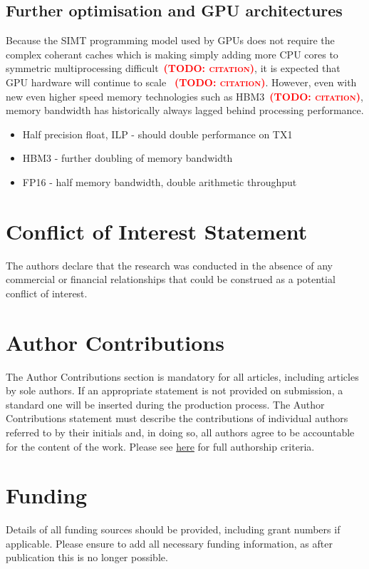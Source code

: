 \documentclass[utf8]{frontiersSCNS} %
\newcommand{\todo}[1]{\textbf{\textsc{\textcolor{red}{(TODO: #1)}}}}
\begin{document}
\subsection{Further optimisation and GPU architectures}

Because the SIMT programming model used by GPUs does not require the complex coherant caches which is making simply adding more CPU cores to symmetric multiprocessing difficult~\todo{citation}, it is expected that GPU hardware will continue to scale~ \todo{citation}.
However, even with new even higher speed memory technologies such as HBM3~\todo{citation}, memory bandwidth has historically always lagged behind processing performance.


\begin{itemize}
    \item Half precision float, ILP - should double performance on TX1
\end{itemize}

\begin{itemize}
    \item HBM3 - further doubling of memory bandwidth
    \item FP16 - half memory bandwidth, double arithmetic throughput
\end{itemize}

\section*{Conflict of Interest Statement}
The authors declare that the research was conducted in the absence of any commercial or financial relationships that could be construed as a potential conflict of interest.

\section*{Author Contributions}
The Author Contributions section is mandatory for all articles, including articles by sole authors. If an appropriate statement is not provided on submission, a standard one will be inserted during the production process. The Author Contributions statement must describe the contributions of individual authors referred to by their initials and, in doing so, all authors agree to be accountable for the content of the work. Please see  \href{http://home.frontiersin.org/about/author-guidelines#AuthorandContributors}{here} for full authorship criteria.

\section*{Funding}
Details of all funding sources should be provided, including grant numbers if applicable. Please ensure to add all necessary funding information, as after publication this is no longer possible.
\end{document}

